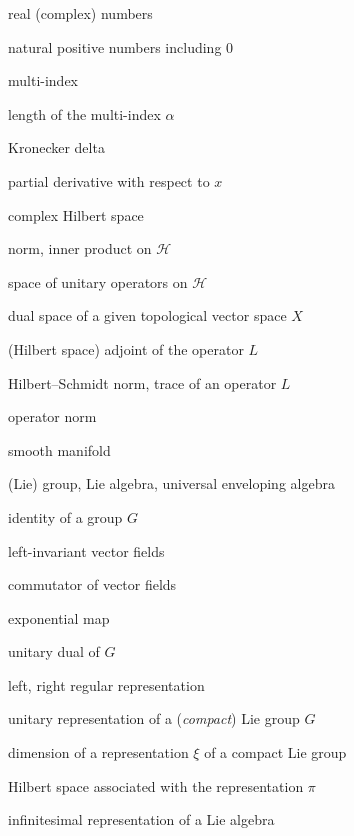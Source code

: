 \documentclass[12pt,oneside,a4paper]{book}
\numberwithin{equation}{section}     %
\theoremstyle{plain}
\theoremstyle{definition}
\DeclareMathOperator{\Tr}{Tr}
\DeclareMathOperator{\OP}{op}
\newcommand{\C}{{\mathbb C}}
\newcommand{\N}{{\mathbb N}}
\newcommand{\R}{{\mathbb R}}
\newcommand{\HS}{{\mathtt{HS}}}
\newcommand{\Gh}{{\widehat{G}}}
\begin{document}
\begin{abbrv}
	\item[$\R$ $(\C)$]				real (complex) numbers
	\item[$\N_0$] 				natural positive numbers including $0$
	\item[$\alpha\in\N^n_0$] 			multi-index
	\item[$|\alpha|$]					length of the multi-index $\alpha$
	\item[$\delta_{m,n}$] 			Kronecker delta	
	\item[$\partial_x$]				partial derivative with respect to $x$
	\item[$\mathcal{H}$]		complex Hilbert space
	\item[$\|\cdot\|_{\mathcal{H}}$, $(\cdot,\cdot)_{\mathcal{H}}$] 			norm, inner product on $\mathcal{H}$
	\item[$\mathcal{U}(\mathcal{H})$]         space of unitary operators on $\mathcal{H}$
	\item[$X'$]             	dual space of a given topological vector space $X$    											
	\item[$L^*$]					(Hilbert space) adjoint of the operator $L$
	\item[$\|L\|_{\HS}$, $\Tr(L)$]                Hilbert--Schmidt norm, trace of an operator $L$
	\item[ $\|\cdot\|_{\OP}$] 				operator norm
	\item[$M$]					smooth manifold
	\item[$G$, $\mathfrak{g}$, $\mathfrak{U}(\mathfrak{g})$]     (Lie) group, Lie algebra, universal enveloping algebra
	\item[$e$]     					identity of a group $G$
	\item[$X_1,X_2,\dots$] 				left-invariant vector fields 
	\item[${[\cdot,\cdot]}$] 				commutator of vector fields
	\item[$\exp_{G}$]				exponential map 
	\item[$\Gh$] 					unitary dual of $G$	
	\item[$\pi_L$, $\pi_R$]     		left, right regular representation
	\item[$\pi$, ($\xi$)] 				unitary representation of a (\textit{compact}) Lie group $G$	
	\item[$d_\xi$]				dimension of a representation $\xi$ of a compact Lie group
	\item[$\mathcal{H}_\pi$]			Hilbert space associated with the representation $\pi$
	\item[$d\pi$ or $\pi$]  	infinitesimal representation of a Lie algebra

\end{abbrv}
\end{document}

